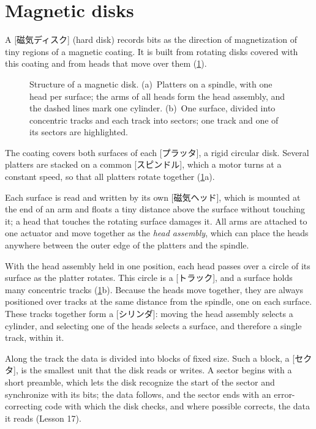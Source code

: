 \documentclass[../main.tex]{subfiles}
\begin{document}
\section{Magnetic disks}
\label{sec:l16-disk}

A [磁気ディスク]
(hard disk) records bits as the direction of magnetization of tiny regions of
a magnetic coating.  It is built
from rotating disks covered with this coating and from heads that move over
them (\cref{fig:l16-disk}).

\begin{figure}[htbp]
  \centering
  
  \caption{Structure of a magnetic disk.  (a)~Platters on a spindle, with one
    head per surface; the arms of all heads form the head assembly, and the
    dashed lines mark one cylinder.  (b)~One surface, divided into
    concentric tracks and each track into sectors; one track and one of its
    sectors are highlighted.}
  \label{fig:l16-disk}
\end{figure}

The coating covers both surfaces of each [プラッタ], a rigid
circular disk.  Several platters are stacked on a common
[スピンドル], which a motor turns at a constant speed, so that
all platters rotate together (\cref{fig:l16-disk}a).

Each surface is read and written by its own
[磁気ヘッド], which is mounted at the end of an arm and
floats a tiny distance above the surface without touching it; a head that
touches the rotating surface damages it.  All arms are attached to one
actuator and move together as the \emph{head assembly}, which can place the
heads anywhere between the outer edge of the platters and the spindle.

With the head assembly held in one position, each head passes over a circle
of its surface as the platter rotates.  This circle is a
[トラック], and a surface holds many concentric tracks
(\cref{fig:l16-disk}b).  Because the heads move together, they are always
positioned over tracks at the same distance from the spindle, one on each
surface.  These tracks together form a [シリンダ]: moving the
head assembly selects a cylinder, and selecting one of the heads selects a
surface, and therefore a single track, within it.

Along the track the data is divided into blocks of fixed size.  Such a block,
a [セクタ], is the smallest unit that the disk reads or writes.
A sector begins with a short preamble, which lets the disk recognize the
start of the sector and synchronize with its bits; the data follows, and the
sector ends with an error-correcting code with which the disk checks, and
where possible corrects, the data it reads (Lesson 17).
\end{document}
